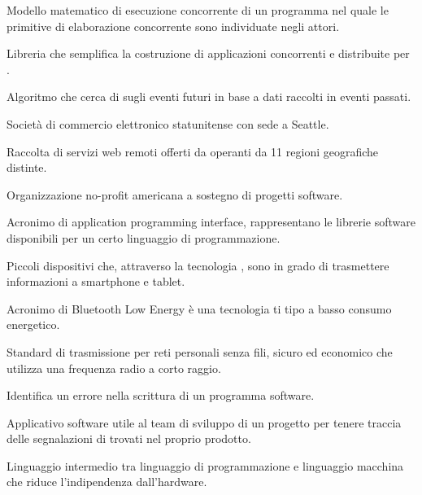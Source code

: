 





\makeFrontPage



\clearpage
\tableofcontents

Modello matematico di esecuzione concorrente di un programma nel quale le primitive di elaborazione concorrente sono individuate negli attori.

Libreria  che semplifica la costruzione di applicazioni concorrenti e distribuite per .

Algoritmo che cerca di  sugli eventi futuri in base a dati raccolti in eventi passati.

Societ\`a di commercio elettronico statunitense con sede a Seattle.

 Raccolta di servizi web remoti offerti da  operanti da 11 regioni geografiche distinte.

Organizzazione no-profit americana a sostegno di progetti software.

Acronimo di application programming interface, rappresentano le librerie software disponibili per un certo linguaggio di programmazione.
\clearpage

Piccoli dispositivi che, attraverso la tecnologia , sono in grado di trasmettere informazioni a smartphone e tablet.

Acronimo di Bluetooth Low Energy \`e una tecnologia ti tipo  a basso consumo energetico.

Standard di trasmissione per reti personali senza fili, sicuro ed economico che utilizza una frequenza radio a corto raggio.

Identifica un errore nella scrittura di un programma software.

Applicativo software utile al team di sviluppo di un progetto per tenere traccia delle segnalazioni di  trovati nel proprio prodotto.
 
Linguaggio intermedio tra linguaggio di programmazione e linguaggio macchina che riduce l'indipendenza dall'hardware.
\clearpage

